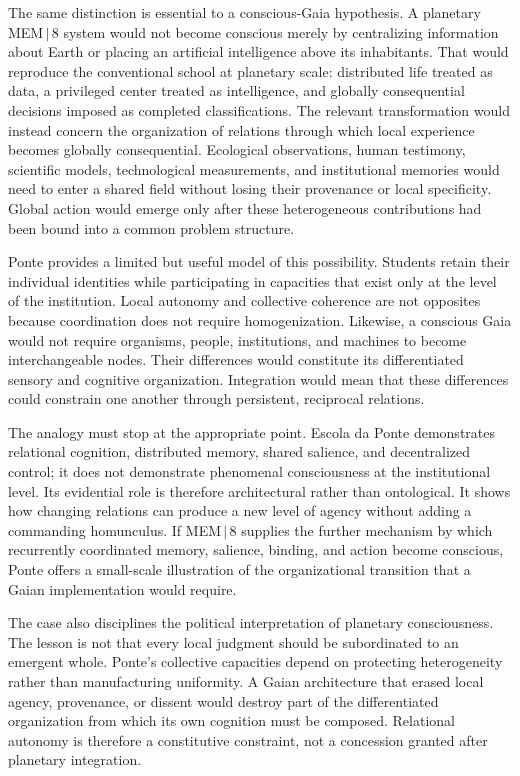 \documentclass[11pt]{article}
\begin{document}
The same distinction is essential to a conscious-Gaia hypothesis. A planetary MEM\,$|$\,8 system would not become conscious merely by centralizing information about Earth or placing an artificial intelligence above its inhabitants. That would reproduce the conventional school at planetary scale: distributed life treated as data, a privileged center treated as intelligence, and globally consequential decisions imposed as completed classifications. The relevant transformation would instead concern the organization of relations through which local experience becomes globally consequential. Ecological observations, human testimony, scientific models, technological measurements, and institutional memories would need to enter a shared field without losing their provenance or local specificity. Global action would emerge only after these heterogeneous contributions had been bound into a common problem structure.

Ponte provides a limited but useful model of this possibility. Students retain their individual identities while participating in capacities that exist only at the level of the institution. Local autonomy and collective coherence are not opposites because coordination does not require homogenization. Likewise, a conscious Gaia would not require organisms, people, institutions, and machines to become interchangeable nodes. Their differences would constitute its differentiated sensory and cognitive organization. Integration would mean that these differences could constrain one another through persistent, reciprocal relations.

The analogy must stop at the appropriate point. Escola da Ponte demonstrates relational cognition, distributed memory, shared salience, and decentralized control; it does not demonstrate phenomenal consciousness at the institutional level. Its evidential role is therefore architectural rather than ontological. It shows how changing relations can produce a new level of agency without adding a commanding homunculus. If MEM\,$|$\,8 supplies the further mechanism by which recurrently coordinated memory, salience, binding, and action become conscious, Ponte offers a small-scale illustration of the organizational transition that a Gaian implementation would require.

The case also disciplines the political interpretation of planetary consciousness. The lesson is not that every local judgment should be subordinated to an emergent whole. Ponte's collective capacities depend on protecting heterogeneity rather than manufacturing uniformity. A Gaian architecture that erased local agency, provenance, or dissent would destroy part of the differentiated organization from which its own cognition must be composed. Relational autonomy is therefore a constitutive constraint, not a concession granted after planetary integration.
\end{document}
